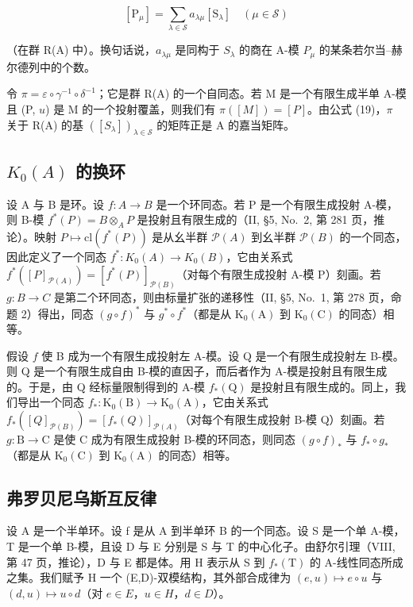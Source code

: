 \[
[ \mathrm{P} _ {\mu} ] = \sum_ {\lambda \in \mathcal {S}} a _ {\lambda \mu} [ \mathrm{S} _ {\lambda} ] \quad (\mu \in \mathcal {S})\tag{19}
\]

（在群 R(A) 中）。换句话说，\(a_{\lambda\mu}\) 是同构于 \(S_{\lambda}\) 的商在 A-模 \(P_{\mu}\) 的某条若尔当–赫尔德列中的个数。

令 \(\pi = \varepsilon \circ \gamma^{-1} \circ \delta^{-1}\)；它是群 R(A) 的一个自同态。若 M 是一个有限生成半单 A-模且 (P, \(u\)) 是 M 的一个投射覆盖，则我们有 \(\pi([M]) = [P]\)。由公式 (19)，\(\pi\) 关于 R(A) 的基 \(([S_{\lambda}])_{\lambda \in \mathcal{S}}\) 的矩阵正是 A 的嘉当矩阵。

\subsection{\texorpdfstring{\(K_{0}(A)\) 的换环}{K\_\{0\}(A) 的换环}}

设 A 与 B 是环。设 \(f: A \to B\) 是一个环同态。若 P 是一个有限生成投射 A-模，则 B-模 \(f^{*}(P) = B \otimes_{A} P\) 是投射且有限生成的（II, §5, No.~2, 第 281 页，推论）。映射 \(P \mapsto \text{cl}(f^{*}(P))\) 是从幺半群 \(\mathcal{P}(A)\) 到幺半群 \(\mathcal{P}(B)\) 的一个同态，因此定义了一个同态 \(f^{*}: K_{0}(A) \to K_{0}(B)\)，它由关系式 \(f^{*}([P]_{\mathcal{P}(A)}) = [f^{*}(P)]_{\mathcal{P}(B)}\)（对每个有限生成投射 A-模 P）刻画。若 \(g: B \to C\) 是第二个环同态，则由标量扩张的递移性（II, §5, No.~1, 第 278 页，命题 2）得出，同态 \((g \circ f)^*\) 与 \(g^{*} \circ f^{*}\)（都是从 \(\mathrm{K}_{0}(\mathrm{A})\) 到 \(\mathrm{K}_{0}(\mathrm{C})\) 的同态）相等。

假设 \(f\) 使 B 成为一个有限生成投射左 A-模。设 Q 是一个有限生成投射左 B-模。则 Q 是一个有限生成自由 B-模的直因子，而后者作为 A-模是投射且有限生成的。于是，由 Q 经标量限制得到的 A-模 \(f_{*}(\mathrm{Q})\) 是投射且有限生成的。同上，我们导出一个同态 \(f_{*}: \mathrm{K}_{0}(\mathrm{B}) \to \mathrm{K}_{0}(\mathrm{A})\)，它由关系式 \(f_{*}([Q]_{\mathcal{P}(B)}) = [f_{*}(Q)]_{\mathcal{P}(A)}\)（对每个有限生成投射 B-模 Q）刻画。若 \(g: \mathrm{B} \to \mathrm{C}\) 是使 C 成为有限生成投射 B-模的环同态，则同态 \((g \circ f)_{*}\) 与 \(f_{*} \circ g_{*}\)（都是从 \(\mathrm{K}_{0}(\mathrm{C})\) 到 \(\mathrm{K}_{0}(\mathrm{A})\) 的同态）相等。

\subsection{弗罗贝尼乌斯互反律}

设 A 是一个半单环。设 f 是从 A 到半单环 B 的一个同态。设 S 是一个单 A-模，T 是一个单 B-模，且设 D 与 E 分别是 S 与 T 的中心化子。由舒尔引理（VIII, 第 47 页，推论），D 与 E 都是体。用 H 表示从 S 到 \(f_{*}(\mathrm{T})\) 的 A-线性同态所成之集。我们赋予 H 一个 (E,D)-双模结构，其外部合成律为 \((e,u)\mapsto e\circ u\) 与 \((d,u)\mapsto u\circ d\)（对 \(e\in E\)，\(u\in H\)，\(d\in D\)）。

